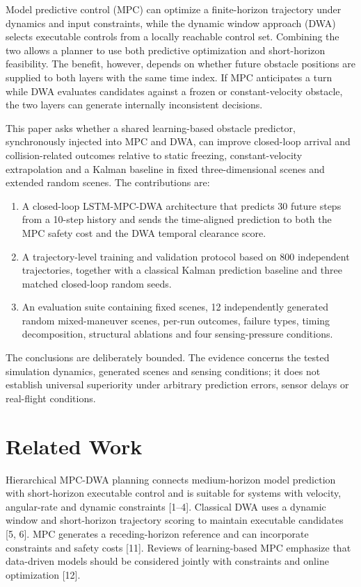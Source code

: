 \documentclass[10pt,a4paper]{article}
\begin{document}
Model predictive control (MPC) can optimize a finite-horizon trajectory under dynamics and input constraints, while the dynamic window approach (DWA) selects executable controls from a locally reachable control set. Combining the two allows a planner to use both predictive optimization and short-horizon feasibility. The benefit, however, depends on whether future obstacle positions are supplied to both layers with the same time index. If MPC anticipates a turn while DWA evaluates candidates against a frozen or constant-velocity obstacle, the two layers can generate internally inconsistent decisions.

This paper asks whether a shared learning-based obstacle predictor, synchronously injected into MPC and DWA, can improve closed-loop arrival and collision-related outcomes relative to static freezing, constant-velocity extrapolation and a Kalman baseline in fixed three-dimensional scenes and extended random scenes. The contributions are:

\begin{enumerate}[leftmargin=*]
\item A closed-loop LSTM-MPC-DWA architecture that predicts 30 future steps from a 10-step history and sends the time-aligned prediction to both the MPC safety cost and the DWA temporal clearance score.
\item A trajectory-level training and validation protocol based on 800 independent trajectories, together with a classical Kalman prediction baseline and three matched closed-loop random seeds.
\item An evaluation suite containing fixed scenes, 12 independently generated random mixed-maneuver scenes, per-run outcomes, failure types, timing decomposition, structural ablations and four sensing-pressure conditions.
\end{enumerate}

The conclusions are deliberately bounded. The evidence concerns the tested simulation dynamics, generated scenes and sensing conditions; it does not establish universal superiority under arbitrary prediction errors, sensor delays or real-flight conditions.

\section{Related Work}

Hierarchical MPC-DWA planning connects medium-horizon model prediction with short-horizon executable control and is suitable for systems with velocity, angular-rate and dynamic constraints [1–4]. Classical DWA uses a dynamic window and short-horizon trajectory scoring to maintain executable candidates [5, 6]. MPC generates a receding-horizon reference and can incorporate constraints and safety costs [11]. Reviews of learning-based MPC emphasize that data-driven models should be considered jointly with constraints and online optimization [12].
\end{document}

